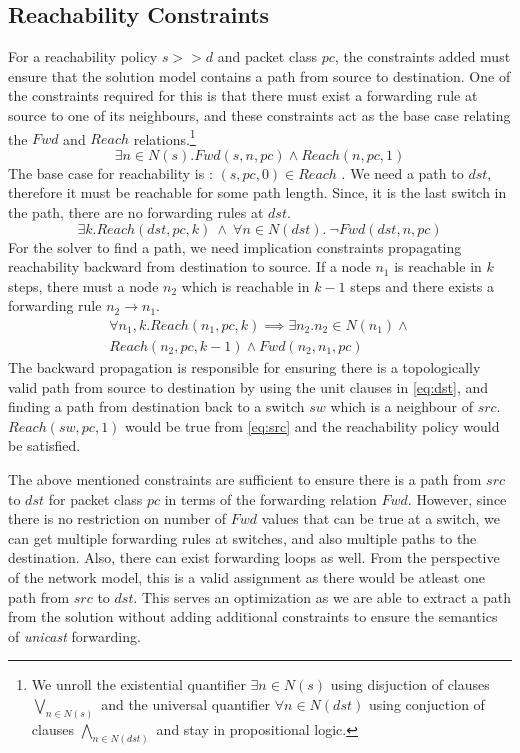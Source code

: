 \subsection{Reachability Constraints} \label{sec:reach}
For a reachability policy $s >> d$ and packet class $pc$, the constraints added must ensure that the solution model contains a path 
from source to destination. 
One of the constraints required for this is that there must exist a forwarding rule at source to one of its neighbours, and 
these constraints
act as the base case relating the $Fwd$ and $Reach$ relations.\footnote{
	We unroll the existential quantifier $\exists n \in N(s)$ using disjuction of 
	clauses $\bigvee\limits_{n \in N(s)}$ and
	the universal quantifier $\forall n \in N(dst)$ using conjuction of clauses $\bigwedge\limits_{n \in N(dst)}$
	and stay in propositional logic.} 
\begin{equation} \label{eq:src}
	\exists n \in N(s). Fwd(s, n, pc) \wedge Reach(n, pc, 1)
\end{equation}
The base case for reachability is : $(s, pc,0) \in Reach$ . We need a path to $dst$, therefore it must be reachable for some path length. Since, it is the last switch in the path, there are no forwarding rules at $dst$.
\begin{equation} \label{eq:dst}
	\exists k. Reach(dst, pc, k) \ \wedge \ \forall n \in N(dst). \ \neg Fwd(dst, n, pc)
\end{equation}
For the solver to find a path, we need implication constraints propagating reachability backward from destination to source. 
If a node $n_1$ is reachable in $k$ steps, there must a node $n_2$ which is reachable in  $k-1$ steps and there exists a forwarding rule $n_2 \rightarrow n_1$.
\begin{multline} \label{eq:bckprop}
\forall n_1,k.  Reach(n_1,pc,k) \implies \exists n_2.  n_2 \in N(n_1) \wedge \\ Reach(n_2,pc,k-1) \wedge Fwd(n_2,n_1,pc)
\end{multline} 
The backward propagation is responsible for ensuring there is a topologically valid path from source to destination by using the unit clauses in \cref{eq:dst}, and finding a path from destination back to a switch $sw$ which is a neighbour of $src$. $Reach(sw,pc,1)$ would be true from \cref{eq:src} and the reachability policy would be satisfied. 

The above mentioned constraints are sufficient to ensure there is a path from $src$ to $dst$ for packet class $pc$ in terms of the forwarding relation $Fwd$. However, since there is no restriction on number of $Fwd$ values that can be true at a switch, we can get multiple forwarding rules at switches, and also multiple paths to the destination. Also, there can exist forwarding loops as well. From the perspective of the network model, 
this is a valid assignment as there would be atleast one path from $src$ to $dst$. 
This serves an optimization as we are able to extract a path from the solution without 
adding additional constraints to ensure the semantics of \emph{unicast} forwarding. 

